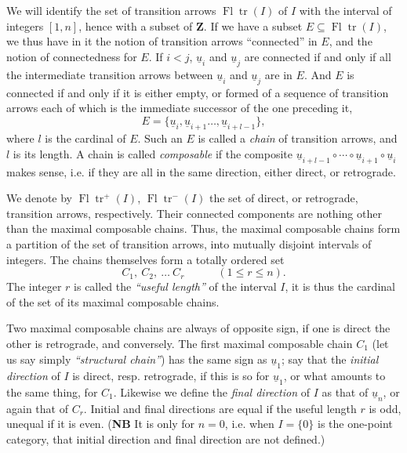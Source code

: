 \documentclass[11pt]{article}
\newcommand{\printedpage}[1]{\marginpar{\footnotesize p.~#1}}
\newcommand{\msp}[1]{\marginpar{\footnotesize [#1]}}
\newcommand{\Fltr}{\operatorname{Fl}\operatorname{tr}}
\begin{document}
We will identify the set of transition arrows $\Fltr(I)$ of $I$ with the interval of integers $[1,n]$, hence with a subset of $\mathbf{Z}$. If we have a subset $E\subseteq\Fltr(I)$, we thus have in it the notion of transition arrows ``connected'' in $E$, and the notion of connectedness for $E$. If $i<j$, $\underline{u}_i$ and $\underline{u}_j$ are connected if and only if all the intermediate transition arrows between $\underline{u}_i$ and $\underline{u}_j$ are in $E$. And $E$ is connected if and only if it is either empty, or formed of a sequence of transition arrows each of which is the immediate successor of the one preceding it, %
\[
E=\{\underline{u}_i,\underline{u}_{i+1}\ldots,\underline{u}_{i+l-1}\}, %
\]
where $l$ is the cardinal of $E$. Such an $E$ is called a \textit{chain} of transition arrows, and $l$ is its length. A chain is called \textit{composable} if the composite $\underline{u}_{i+l-1}\circ\cdots\circ\underline{u}_{i+1}\circ\underline{u}_i$ makes sense, i.e. if they are all in the same direction, either direct, or retrograde.

We denote by $\Fltr^+(I)$, $\Fltr^-(I)$ the set of direct, or retrograde, transition arrows, respectively. Their connected components are nothing other than the maximal composable chains. Thus, the maximal composable chains form a partition of the set of transition arrows, into mutually disjoint intervals of integers. The chains themselves form a totally ordered set
\[
C_1,\ C_2,\ \ldots\ C_r\qquad\quad(1\leq r\leq n).
\]
The integer $r$ is called the \textit{``useful length''} of the interval
\msp{page 4}
$I$, it is thus the cardinal of the set of its maximal composable chains.

Two maximal composable chains are always of opposite sign, if one is direct the other is retrograde, and conversely. The first maximal composable chain $C_1$ (let us say simply \textit{``structural chain''}) has the same sign as $\underline{u}_1$; say that the \textit{initial direction} of $I$ is direct, resp. retrograde, if this is so for $\underline{u}_1$, or what amounts to the same thing, for $C_1$. Likewise we define the \textit{final direction} of $I$ as that of $\underline{u}_n$, or again that of $C_r$. Initial and final directions are equal if the useful length $r$ is
\printedpage{3}
odd, unequal if it is even. (\textbf{NB} It is only for $n=0$, i.e. when $I=\{0\}$ is the one-point category, that initial direction and final direction are not defined.)
\end{document}
